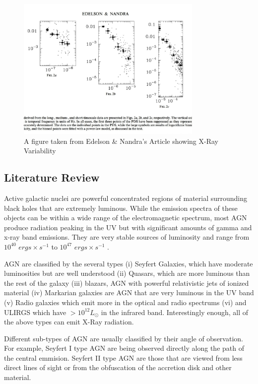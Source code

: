 \documentclass[letterpaper,11pt,twocolumn]{article}
\begin{document}
\begin{figure}[t]
\includegraphics[width=0.8\textwidth]{Images/Elson_Image.pdf} 
\caption{
A figure taken from Edelson \& Nandra's Article showing X-Ray Variability
\label{fig:Elson_Image}
}
\end{figure}


\subsection{Literature Review}

Active galactic nuclei are powerful concentrated regions of material surrounding black holes that are extremely luminous. While the emission spectra of these objects can be within a wide range of the electromagnetic spectrum, most AGN produce radiation peaking in the UV but with significant amounts of gamma and x-ray band emissions. They are very stable sources of luminosity and range from $10^{40}$ $ergs \times s^{-1}$ to $10^{47}$ $ergs \times s^{-1}$ {\it \citet{F+8}}.

    AGN are classified by the several types
(i) Seyfert Galaxies, which have moderate luminosities but are well understood (ii) Quasars, which are more luminous than the rest of the galaxy (iii) blazars, AGN with powerful relativistic jets of ionized material {\it \citet{F+8}} (iv) Markarian galaxies are AGN that are very luminous in the UV band (v) Radio galaxies which emit more in the optical and radio spectrums (vi) and ULIRGS which have $>10^{12} L_\odot$ in the infrared band. Interestingly enough, all of the above types can emit X-Ray radiation.

Different sub-types of AGN are usually classified by their angle of observation. For example, Seyfert I type AGN are being observed directly along the path of the central emmision. Seyfert II type AGN are those that are viewed from less direct lines of sight or from the obfuscation of the accretion disk and other material.
\end{document}

